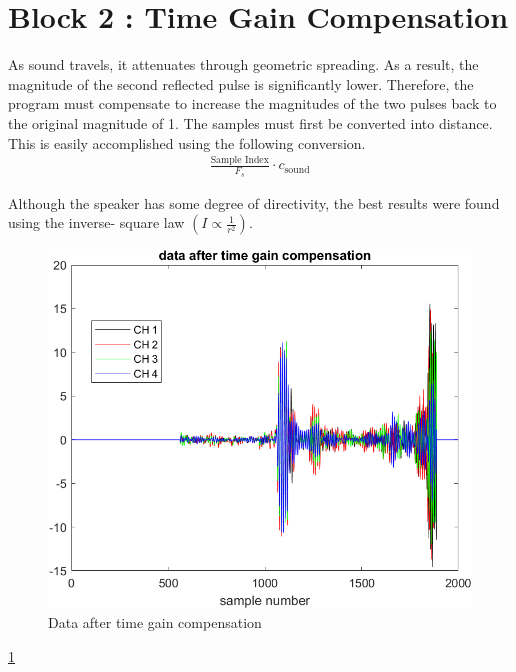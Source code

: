 \section{Block 2 : Time Gain Compensation}

As sound travels, it attenuates through geometric spreading.  As a result, the magnitude of the second reflected pulse is significantly lower. Therefore, the program must compensate to increase the magnitudes of the two pulses back to the original magnitude of 1. 
    The samples must first be converted into distance. This is easily accomplished using the following conversion.
    \begin{align*}
     \frac{\text{Sample Index}}{F_s} \cdot c_{\text{sound}}    
    \end{align*}
    

    Although the speaker has some degree of directivity, the best results were found using the inverse- square law $(I \propto  \frac{1} {r^2} )$. 

    \begin{figure}[H]
        \centering
        \includegraphics[width=0.5\linewidth]{figures/time_gain_1.png}
        \caption{Data after time gain compensation}
        \label{fig:time_gain1}
    \end{figure}

    \ref{fig:time_gain1}

